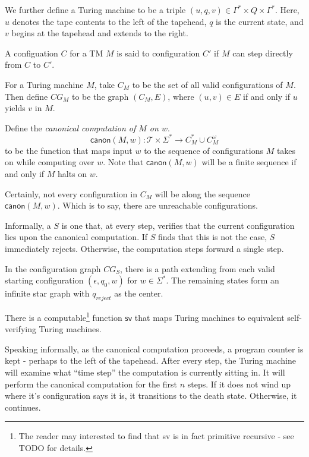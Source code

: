 \documentclass[11pt]{article}
\begin{document}
We further define a Turing machine  to be a triple
$(u, q, v) \in \Gamma^* \times Q \times \Gamma^*$. Here, $u$ denotes
the tape contents to the left of the tapehead, $q$ is the current
state, and $v$ begins at the tapehead and extends to the right.

A configuation $C$ for a TM $M$ is said to  configuration
$C'$ if $M$ can step directly from $C$ to $C'$.

For a Turing machine $M$, take $C_M$ to be the set of all valid
configurations of $M$. Then define $CG_M$ to be the graph $(C_M, E)$,
where $(u,v) \in E$ if and only if $u$ yields $v$ in $M$.
\begin{definition}
Define the \emph{canonical computation of $M$ on $w$}.
\[
  \textsf{canon}(M, w) : \mathcal{T} \times \Sigma^*
      \rightarrow
       C_M^*\cup C_M^\omega
\]
to be the function that maps input $w$ to the sequence of
configurations $M$ takes on while computing over $w$. Note that
$\textsf{canon}(M, w)$ will be a finite sequence if and only if $M$
halts on $w$.
\end{definition}

Certainly, not every configuration in $C_M$ will be along the sequence
$\textsf{canon}(M,w)$. Which is to say, there are unreachable
configurations.

Informally, a  $S$ is one that, at
every step, verifies that the current configuration lies upon the
canonical computation. If $S$ finds that this is not the case, $S$
immediately rejects. Otherwise, the computation steps forward a single
step.

In the configuration graph $CG_S$, there is a path extending from each
valid starting configuration $(\epsilon, q_0, w)$ for $w \in \Sigma^*$. The remaining states form an infinite star graph with $q_{reject}$ as the center.

\begin{proposition}
  There is a computable\footnote{The reader may interested to find
  that \textsf{sv} is in fact primitive recursive - see TODO for
  details.} function $\textsf{sv}$ that maps Turing machines to
  equivalent self-verifying Turing machines.
\end{proposition}

Speaking informally, as the canonical computation proceeds, a program
counter is kept - perhaps to the left of the tapehead. After every
step, the Turing machine will examine what ``time step'' the
computation is currently sitting in. It will perform the canonical
computation for the first $n$ steps. If it does not wind up where it's
configuration says it is, it transitions to the death
state. Otherwise, it continues.
\end{document}

